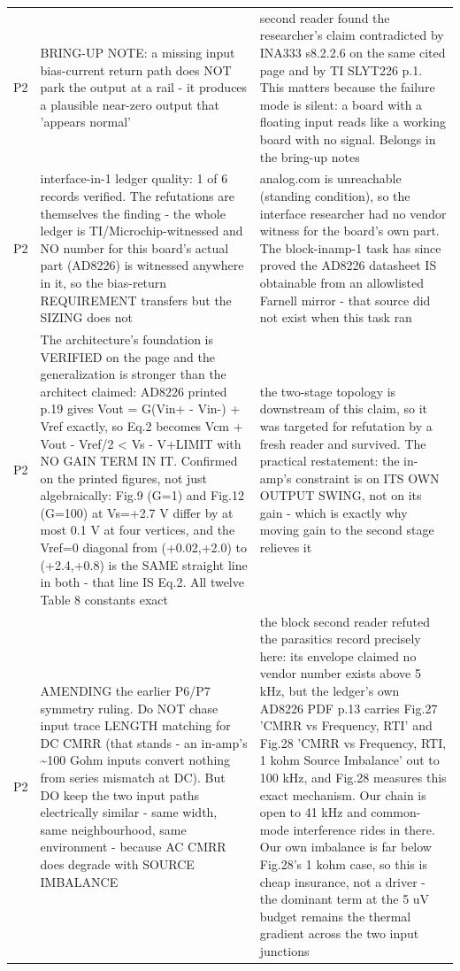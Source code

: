 \documentclass[11pt,a4paper]{article}
\begin{document}
{\begin{longtable}{lp{5.2cm}p{7.2cm}}
P2 & BRING-UP NOTE: a missing input bias-current return path does NOT park the output at a rail - it produces a plausible near-zero output that 'appears normal' & second reader found the researcher's claim contradicted by INA333 s8.2.2.6 on the same cited page and by TI SLYT226 p.1. This matters because the failure mode is silent: a board with a floating input reads like a working board with no signal. Belongs in the bring-up notes \\
P2 & interface-in-1 ledger quality: 1 of 6 records verified. The refutations are themselves the finding - the whole ledger is TI/Microchip-witnessed and NO number for this board's actual part (AD8226) is witnessed anywhere in it, so the bias-return REQUIREMENT transfers but the SIZING does not & analog.com is unreachable (standing condition), so the interface researcher had no vendor witness for the board's own part. The block-inamp-1 task has since proved the AD8226 datasheet IS obtainable from an allowlisted Farnell mirror - that source did not exist when this task ran \\
P2 & The architecture's foundation is VERIFIED on the page and the generalization is stronger than the architect claimed: AD8226 printed p.19 gives Vout = G(Vin+ - Vin-) + Vref exactly, so Eq.2 becomes Vcm + \textbar{}Vout - Vref\textbar{}/2 \textless{} Vs - V+LIMIT with NO GAIN TERM IN IT. Confirmed on the printed figures, not just algebraically: Fig.9 (G=1) and Fig.12 (G=100) at Vs=+2.7 V differ by at most 0.1 V at four vertices, and the Vref=0 diagonal from (+0.02,+2.0) to (+2.4,+0.8) is the SAME straight line in both - that line IS Eq.2. All twelve Table 8 constants exact & the two-stage topology is downstream of this claim, so it was targeted for refutation by a fresh reader and survived. The practical restatement: the in-amp's constraint is on ITS OWN OUTPUT SWING, not on its gain - which is exactly why moving gain to the second stage relieves it \\
P2 & AMENDING the earlier P6/P7 symmetry ruling. Do NOT chase input trace LENGTH matching for DC CMRR (that stands - an in-amp's \textasciitilde{}100 Gohm inputs convert nothing from series mismatch at DC). But DO keep the two input paths electrically similar - same width, same neighbourhood, same environment - because AC CMRR does degrade with SOURCE IMBALANCE & the block second reader refuted the parasitics record precisely here: its envelope claimed no vendor number exists above 5 kHz, but the ledger's own AD8226 PDF p.13 carries Fig.27 'CMRR vs Frequency, RTI' and Fig.28 'CMRR vs Frequency, RTI, 1 kohm Source Imbalance' out to 100 kHz, and Fig.28 measures this exact mechanism. Our chain is open to 41 kHz and common-mode interference rides in there. Our own imbalance is far below Fig.28's 1 kohm case, so this is cheap insurance, not a driver - the dominant term at the 5 uV budget remains the thermal gradient across the two input junctions \\

\end{longtable}}
\end{document}
